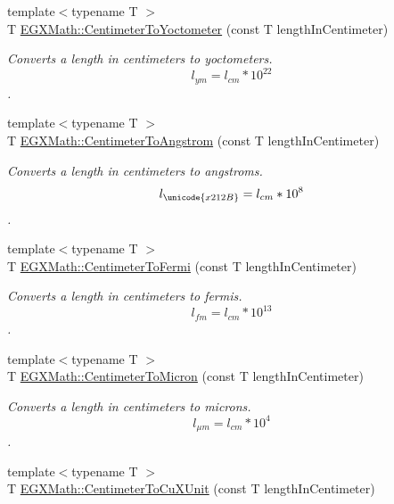\begin{DoxyCompactItemize}
{\footnotesize template$<$typename T $>$ }\\T \mbox{\hyperlink{group___e_g_x_math-_conversions-_length_conversions-_s_i-_centimeter-_s_i_ga251be5adc836253a22a995d9f2ce6782}{E\+G\+X\+Math\+::\+Centimeter\+To\+Yoctometer}} (const T length\+In\+Centimeter)
\begin{DoxyCompactList}\small\item\em Converts a length in centimeters to yoctometers. \[ l_{ym}=l_{cm} * 10^{22} \]. \end{DoxyCompactList}\item 
{\footnotesize template$<$typename T $>$ }\\T \mbox{\hyperlink{group___e_g_x_math-_conversions-_length_conversions-_s_i-_centimeter-_non-_s_i_gacabf2b01cd8676ffb5ec8c70ecd621b6}{E\+G\+X\+Math\+::\+Centimeter\+To\+Angstrom}} (const T length\+In\+Centimeter)
\begin{DoxyCompactList}\small\item\em Converts a length in centimeters to angstroms. \[ l_{\unicode{x212B}}=l_{cm} * 10^{8} \]. \end{DoxyCompactList}\item 
{\footnotesize template$<$typename T $>$ }\\T \mbox{\hyperlink{group___e_g_x_math-_conversions-_length_conversions-_s_i-_centimeter-_non-_s_i_ga0b55e847f11e0ba8313d4556d23684dd}{E\+G\+X\+Math\+::\+Centimeter\+To\+Fermi}} (const T length\+In\+Centimeter)
\begin{DoxyCompactList}\small\item\em Converts a length in centimeters to fermis. \[ l_{fm}=l_{cm} * 10^{13} \]. \end{DoxyCompactList}\item 
{\footnotesize template$<$typename T $>$ }\\T \mbox{\hyperlink{group___e_g_x_math-_conversions-_length_conversions-_s_i-_centimeter-_non-_s_i_gaee509ac676e86ed54994792f82dab9f7}{E\+G\+X\+Math\+::\+Centimeter\+To\+Micron}} (const T length\+In\+Centimeter)
\begin{DoxyCompactList}\small\item\em Converts a length in centimeters to microns. \[ l_{\mu m}=l_{cm} * 10^{4} \]. \end{DoxyCompactList}\item 
{\footnotesize template$<$typename T $>$ }\\T \mbox{\hyperlink{group___e_g_x_math-_conversions-_length_conversions-_s_i-_centimeter-_non-_s_i_ga98d44269c80a1c5ab7c38d27aba39517}{E\+G\+X\+Math\+::\+Centimeter\+To\+Cu\+X\+Unit}} (const T length\+In\+Centimeter)

\end{DoxyCompactItemize}
